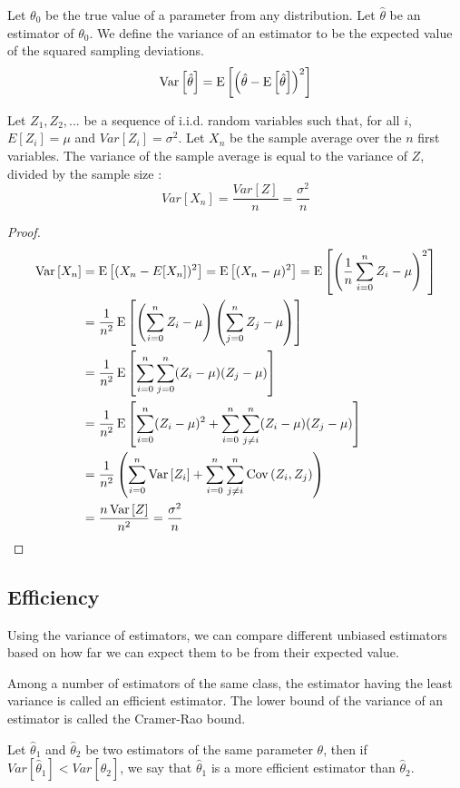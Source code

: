 \begin{definition}
Let $\theta_0$ be the true value of a parameter from any distribution. Let $\hat{\theta}$ be an estimator of $\theta_0$. We define the variance of an estimator to be the expected value of the squared sampling deviations. $$\operatorname{Var}\left[\hat{\theta}\right] = \operatorname{E}\left[\left(\hat\theta - \operatorname{E}\left[\hat\theta\right]\right)^2\right] $$
\end{definition}

\begin{proposition}
Let $Z_1, Z_2, ...$ be a sequence of i.i.d. random variables such that, for all $i$, $E[Z_i] = \mu$ and $Var[Z_i] = \sigma^2$. Let $X_n$ be the sample average over the $n$ first variables. The variance of the sample average is equal to the variance of $Z$, divided by the sample size : $$ Var[X_n] = \frac{Var[Z]}{n} = \frac{\sigma^2}{n} $$
\end{proposition}

\begin{proof}
\begin{align*}
\operatorname{Var}\left[X_n\right] & = \operatorname{E}\left[(X_n - E[X_n])^2\right] = \operatorname{E}\left[(X_n - \mu)^2\right] = \operatorname{E}\left[\left(\frac{1}{n}\sum_{i=0}^{n} Z_i - \mu\right)^2\right] \\
& = \frac{1}{n^2}\operatorname{E}\left[\left(\sum_{i=0}^{n} Z_i - \mu\right)\left(\sum_{j=0}^{n} Z_j - \mu \right)\right] \\
& = \frac{1}{n^2}\operatorname{E}\left[\sum_{i=0}^{n}\sum_{j=0}^{n} (Z_i - \mu)( Z_j - \mu)\right] \\
& = \frac{1}{n^2}\operatorname{E}\left[\sum_{i=0}^{n}(Z_i - \mu)^2 + \sum_{i=0}^{n}\sum_{j\neq i}^{n} (Z_i - \mu)( Z_j - \mu)\right] \\
& = \frac{1}{n^2}\left(\sum_{i=0}^{n}\operatorname{Var}\left[Z_i\right] + \sum_{i=0}^{n}\sum_{j\neq i}^{n}\operatorname{Cov}\left(Z_i, Z_j\right) \right)\\
& = \frac{n\operatorname{Var}\left[Z\right]}{n^2} = \frac{\sigma^2}{n}
\end{align*}
\end{proof}

\subsection{Efficiency}

Using the variance of estimators, we can compare different unbiased estimators based on how far we can expect them to be from their expected value.

\begin{definition}
Among a number of estimators of the same class, the estimator having the least variance is called an efficient estimator. The lower bound of the variance of an estimator is called the Cramer-Rao bound.

Let $\hat{\theta}_1$ and $\hat{\theta}_2$ be two estimators of the same parameter $\theta$, then if $Var[\hat{\theta}_1] < Var[\hat{\theta}_2]$, we say that $\hat{\theta}_1$ is a more efficient estimator than $\hat{\theta}_2$. 
\end{definition}

